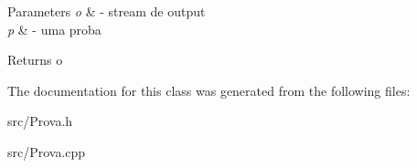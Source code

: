 \begin{DoxyParams}{Parameters}
{\em o} & -\/ stream de output \\
\hline
{\em p} & -\/ uma proba \\
\hline
\end{DoxyParams}
\begin{DoxyReturn}{Returns}
o 
\end{DoxyReturn}


The documentation for this class was generated from the following files\+:\begin{DoxyCompactItemize}
\item 
src/Prova.\+h\item 
src/Prova.\+cpp\end{DoxyCompactItemize}
